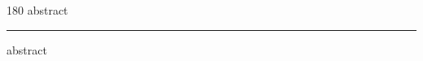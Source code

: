 
\begin{frame}
\begin{center}
\begin{turn}{180}
{\fontsize{2.5cm}{1em}\selectfont abstract}
\end{turn}
\vspace{1em}\par  
\hrule
\vspace{1em}\par  
{\fontsize{2.5cm}{1em}\selectfont abstract}
\end{center}
\end{frame}
